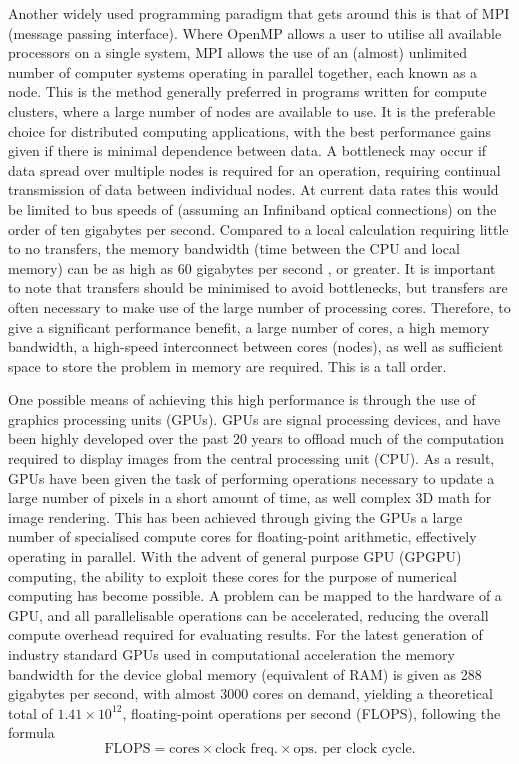 Another widely used programming paradigm that gets around this is that of MPI (message passing interface). Where OpenMP allows a user to utilise all available processors on a single system, MPI allows the use of an (almost) unlimited number of computer systems operating in parallel together, each known as a node. This is the method generally preferred in programs written for compute clusters, where a large number of nodes are available to use. It is the preferable choice for distributed computing applications, with the best performance gains given if there is minimal dependence between data. A bottleneck may occur if data spread over multiple nodes is required for an operation, requiring continual transmission of data between individual nodes. At current data rates this would be limited to bus speeds of (assuming an Infiniband optical connections) on the order of ten gigabytes per second. Compared to a local calculation requiring little to no transfers, the memory bandwidth (time between the CPU and local memory) can be as high as 60 gigabytes per second \cite{DAT:Intel_xeon}, or greater. It is important to note that transfers should be minimised to avoid bottlenecks, but transfers are often necessary to make use of the large number of processing cores. Therefore, to give a significant performance benefit, a large number of cores, a high memory bandwidth, a high-speed interconnect between cores (nodes), as well as sufficient space to store the problem in memory are required. This is a tall order.

One possible means of achieving this high performance is through the use of graphics processing units (GPUs). GPUs are signal processing devices, and have been highly developed over the past 20 years to offload much of the computation required to display images from the central processing unit (CPU). As a result, GPUs have been given the task of performing operations necessary to update a large number of pixels in a short amount of time, as well complex 3D math for image rendering. This has been achieved through giving the GPUs a large number of specialised compute cores for floating-point arithmetic, effectively operating in parallel. With the advent of general purpose GPU (GPGPU) computing, the ability to exploit these cores for the purpose of numerical computing has become possible. A problem can be mapped to the hardware of a GPU, and all parallelisable operations can be accelerated, reducing the overall compute overhead required for evaluating results. For the latest generation of industry standard GPUs used in computational acceleration the memory bandwidth for the device global memory (equivalent of RAM) is given as 288 gigabytes per second, with almost 3000 cores on demand, yielding a theoretical total of $1.41\times10^{12}$, floating-point operations per second (FLOPS), following the formula
\begin{equation}
    \text{FLOPS} = \text{cores}\times\text{clock freq.}\times\text{ops. per clock cycle}.
\end{equation}

